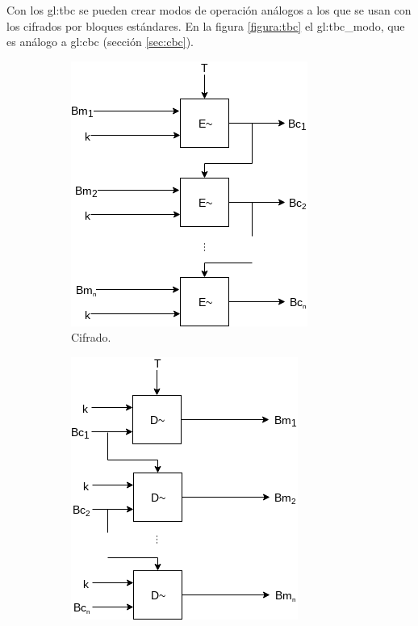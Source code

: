 
Con los \gls{gl:tbc} se pueden crear modos de operación análogos a los que se
usan con los cifrados por bloques estándares. En la figura \ref{figura:tbc}
el \gls{gl:tbc_modo}, que es análogo a \gls{gl:cbc} (sección \ref{sec:cbc}).

\begin{figure}[H]
  \centering
  \begin{subfigure}{0.45\textwidth}
    \begin{center}
      \includegraphics[width=0.7\linewidth]{diagramas/tbc.png}
      \caption{Cifrado.}
    \end{center}
  \end{subfigure}
  \begin{subfigure}{0.45\textwidth}
    \begin{center}
      \includegraphics[width=0.7\linewidth]{diagramas/tbc_inverso.png}

\end{center}
\end{subfigure}
\end{figure}
